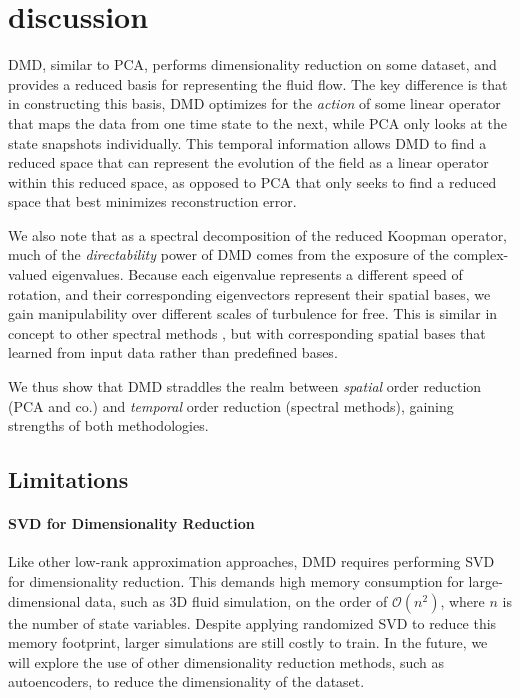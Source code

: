 \section{discussion}
\label{sec:discussion}
DMD, similar to PCA, performs dimensionality reduction on some dataset, and provides a reduced basis for representing the fluid flow. The key difference is that in constructing this basis, DMD optimizes for the \emph{action} of some linear operator that maps the data from one time state to the next, while PCA only looks at the state snapshots individually. This temporal information allows DMD to find a reduced space that can represent the evolution of the field as a linear operator within this reduced space, as opposed to PCA that only seeks to find a reduced space that best minimizes reconstruction error.

We also note that as a spectral decomposition of the reduced Koopman operator, much of the \emph{directability} power of DMD comes from the exposure of the complex-valued eigenvalues. Because each eigenvalue represents a different speed of rotation, and their corresponding eigenvectors represent their spatial bases, we gain manipulability over different scales of turbulence for free. This is similar in concept to other spectral methods \cite{kim2008wavelet}, but with corresponding spatial bases that learned from input data rather than predefined bases. 

We thus show that DMD straddles the realm between \emph{spatial} order reduction (PCA and co.) and \emph{temporal} order reduction (spectral methods), gaining strengths of both methodologies.

\subsection{Limitations}
\label{sec:limitation}
\paragraph{SVD for Dimensionality Reduction}
Like other low-rank approximation approaches, DMD requires performing SVD for dimensionality reduction. This demands high memory consumption for large-dimensional data, such as 3D fluid simulation, on the order of $\mathcal{O}(n^2)$, where $n$ is the number of state variables. Despite applying randomized SVD to reduce this memory footprint, larger simulations are still costly to train. In the future, we will explore the use of other dimensionality reduction methods, such as autoencoders, to reduce the dimensionality of the dataset.

